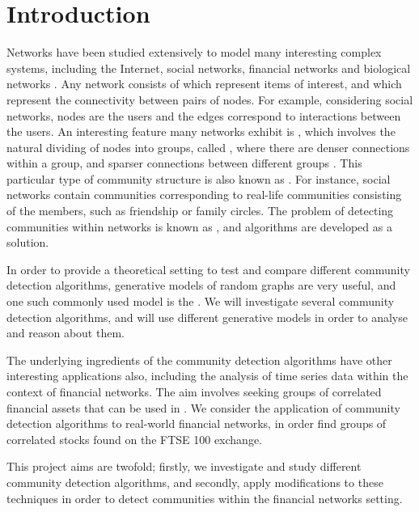 
\chapter{Introduction}

\label{cha:introduction}


Networks have been studied extensively to model many interesting complex systems, including the Internet, social networks, financial networks and biological networks \cite{New06a,DKM+13,MG13}.
Any network consists of  which represent items of interest, and  which represent the connectivity between pairs of nodes. For example, considering social networks, nodes are the users and the edges correspond to interactions between the users.
An interesting feature many networks exhibit is , which involves the natural dividing of nodes into groups, called , where there are denser connections within a group, and sparser connections between different groups \cite{New06a,DKM+13,For10,New06b}. This particular type of community structure is also known as  \cite{DKM+13}. For instance, social networks contain communities corresponding to real-life communities consisting of the members, such as friendship or family circles.
The problem of detecting communities within networks is known as , and algorithms are developed as a solution.

In order to provide a theoretical setting to test and compare different community detection algorithms, generative models of random graphs are very useful, and one such commonly used model is the  \cite{DKM+13,NN12}. We will investigate several community detection algorithms, and will use different generative models in order to analyse and reason about them.

The underlying ingredients of the community detection algorithms have other interesting applications also, including the analysis of time series data within the context of financial networks. The aim involves seeking groups of correlated financial assets that can be used in .
We consider the application of community detection algorithms to real-world financial networks, in order find groups of correlated stocks found on the FTSE 100 exchange.

This project aims are twofold; firstly, we investigate and study different community detection algorithms, and secondly, apply modifications to these techniques in order to detect communities within the financial networks setting.
